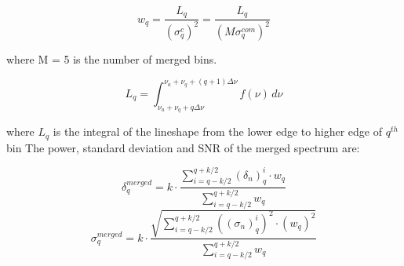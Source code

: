 
\begin{equation}
    \label{eq:merge_weight}
    w_{q} = \frac{L_{q}}{(\sigma_{q}^{c})^{2}} = \frac{L_{q}}{(M\sigma_{q}^{com})^{2}}
\end{equation}

where M = 5 is the number of merged bins.


\begin{equation}
    \label{eq:Lq_integtal}
    L_{q} = \int_{\nu_a +\nu_q + q\Delta\nu}^{\nu_a +\nu_q + (q+1)\Delta\nu} f(\nu) \,d\nu
\end{equation}

where $L_q$ is the integral of the lineshape from the lower edge to higher edge of ${q^{th}}$ bin
The power, standard deviation and SNR of the merged spectrum are:


\begin{equation}
    \label{eq:merged_power}
    \delta_{q}^{merged} = k \cdot \frac{ \sum_{i = q-k/2}^{q+k/2}(\delta_{n})_{q}^{i} \cdot {w_{q}}}{\sum_{i = q-k/2}^{q+k/2} {w_{q}}}
\end{equation}
\begin{equation}
    \label{eq:merged_sigma}
    \sigma_{q}^{merged} = k \cdot \frac{ \sqrt{\sum_{i = q-k/2}^{q+k/2} ((\sigma_{n})_{q}^{i})^2 \cdot {(w_{q})^2}}}{\sum_{i = q-k/2}^{q+k/2} {w_{q}}}
\end{equation}

